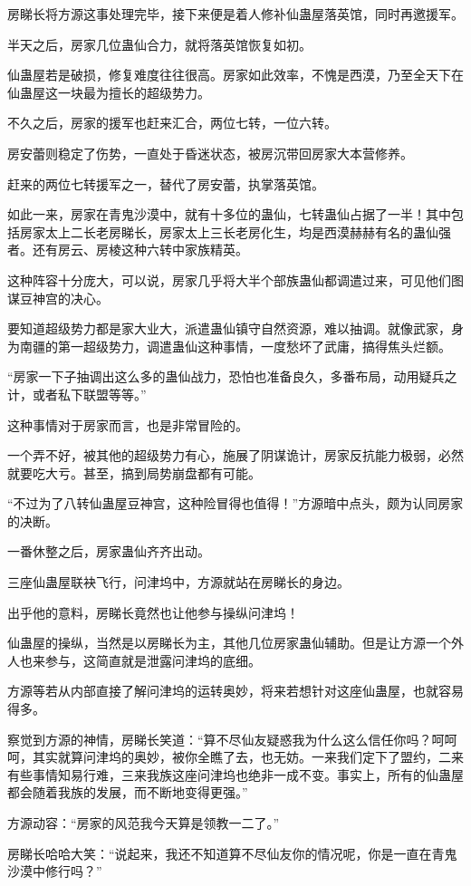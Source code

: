 \begin{this_body}
房睇长将方源这事处理完毕，接下来便是着人修补仙蛊屋落英馆，同时再邀援军。

半天之后，房家几位蛊仙合力，就将落英馆恢复如初。

仙蛊屋若是破损，修复难度往往很高。房家如此效率，不愧是西漠，乃至全天下在仙蛊屋这一块最为擅长的超级势力。

不久之后，房家的援军也赶来汇合，两位七转，一位六转。

房安蕾则稳定了伤势，一直处于昏迷状态，被房沉带回房家大本营修养。

赶来的两位七转援军之一，替代了房安蕾，执掌落英馆。

如此一来，房家在青鬼沙漠中，就有十多位的蛊仙，七转蛊仙占据了一半！其中包括房家太上二长老房睇长，房家太上三长老房化生，均是西漠赫赫有名的蛊仙强者。还有房云、房棱这种六转中家族精英。

这种阵容十分庞大，可以说，房家几乎将大半个部族蛊仙都调遣过来，可见他们图谋豆神宫的决心。

要知道超级势力都是家大业大，派遣蛊仙镇守自然资源，难以抽调。就像武家，身为南疆的第一超级势力，调遣蛊仙这种事情，一度愁坏了武庸，搞得焦头烂额。

“房家一下子抽调出这么多的蛊仙战力，恐怕也准备良久，多番布局，动用疑兵之计，或者私下联盟等等。”

这种事情对于房家而言，也是非常冒险的。

一个弄不好，被其他的超级势力有心，施展了阴谋诡计，房家反抗能力极弱，必然就要吃大亏。甚至，搞到局势崩盘都有可能。

“不过为了八转仙蛊屋豆神宫，这种险冒得也值得！”方源暗中点头，颇为认同房家的决断。

一番休整之后，房家蛊仙齐齐出动。

三座仙蛊屋联袂飞行，问津坞中，方源就站在房睇长的身边。

出乎他的意料，房睇长竟然也让他参与操纵问津坞！

仙蛊屋的操纵，当然是以房睇长为主，其他几位房家蛊仙辅助。但是让方源一个外人也来参与，这简直就是泄露问津坞的底细。

方源等若从内部直接了解问津坞的运转奥妙，将来若想针对这座仙蛊屋，也就容易得多。

察觉到方源的神情，房睇长笑道：“算不尽仙友疑惑我为什么这么信任你吗？呵呵呵，其实就算问津坞的奥妙，被你全瞧了去，也无妨。一来我们定下了盟约，二来有些事情知易行难，三来我族这座问津坞也绝非一成不变。事实上，所有的仙蛊屋都会随着我族的发展，而不断地变得更强。”

方源动容：“房家的风范我今天算是领教一二了。”

房睇长哈哈大笑：“说起来，我还不知道算不尽仙友你的情况呢，你是一直在青鬼沙漠中修行吗？”


\end{this_body}
